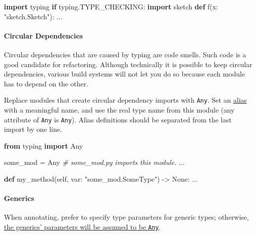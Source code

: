\documentclass[
]{article}
\newenvironment{Shaded}{}{}
\newcommand{\CommentTok}[1]{\textcolor[rgb]{0.38,0.63,0.69}{\textit{#1}}}
\newcommand{\ControlFlowTok}[1]{\textcolor[rgb]{0.00,0.44,0.13}{\textbf{#1}}}
\newcommand{\ImportTok}[1]{\textcolor[rgb]{0.00,0.50,0.00}{\textbf{#1}}}
\newcommand{\KeywordTok}[1]{\textcolor[rgb]{0.00,0.44,0.13}{\textbf{#1}}}
\newcommand{\NormalTok}[1]{#1}
\newcommand{\OperatorTok}[1]{\textcolor[rgb]{0.40,0.40,0.40}{#1}}
\newcommand{\StringTok}[1]{\textcolor[rgb]{0.25,0.44,0.63}{#1}}
\newcommand{\VariableTok}[1]{\textcolor[rgb]{0.10,0.09,0.49}{#1}}
\begin{document}
\begin{samepage}
\begin{Shaded}
\begin{Highlighting}[]
\ImportTok{import}\NormalTok{ typing}
\ControlFlowTok{if}\NormalTok{ typing.TYPE\_CHECKING:}
  \ImportTok{import}\NormalTok{ sketch}
\KeywordTok{def}\NormalTok{ f(x: }\StringTok{"sketch.Sketch"}\NormalTok{): ...}
\end{Highlighting}
\end{Shaded}
\end{samepage}

\paragraph{Circular Dependencies}

Circular dependencies that are caused by typing are code smells. Such
code is a good candidate for refactoring. Although technically it is
possible to keep circular dependencies, various build systems will not
let you do so because each module has to depend on the other.

Replace modules that create circular dependency imports with
\texttt{Any}. Set an \hyperref[typing-aliases]{alias} with a meaningful
name, and use the real type name from this module (any attribute of
\texttt{Any} is \texttt{Any}). Alias definitions should be separated
from the last import by one line.

\begin{samepage}
\begin{Shaded}
\begin{Highlighting}[]
\ImportTok{from}\NormalTok{ typing }\ImportTok{import}\NormalTok{ Any}

\NormalTok{some\_mod }\OperatorTok{=}\NormalTok{ Any  }\CommentTok{\# some\_mod.py imports this module.}
\NormalTok{...}

\KeywordTok{def}\NormalTok{ my\_method(}\VariableTok{self}\NormalTok{, var: }\StringTok{"some\_mod.SomeType"}\NormalTok{) }\OperatorTok{{-}\textgreater{}} \VariableTok{None}\NormalTok{:}
\NormalTok{  ...}
\end{Highlighting}
\end{Shaded}
\end{samepage}

\paragraph{Generics}

When annotating, prefer to specify type parameters for generic types;
otherwise, \href{https://peps.python.org/pep-0484/\#the-any-type}{the
generics' parameters will be assumed to be \texttt{Any}}.
\end{document}
